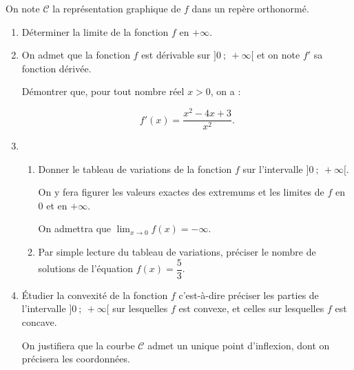\documentclass[10pt,a4paper,french]{article}
\begin{document}
On note $\mathcal{C}$ la représentation graphique de $f$ dans un repère orthonormé.

\medskip

\begin{enumerate}
\item Déterminer la limite de la fonction $f$ en $+\infty$.
\item On admet que la fonction $f$ est dérivable sur $]0~;~ +\infty[$ et on note $f'$ sa fonction dérivée.

Démontrer que, pour tout nombre réel $x > 0$, on a :

\[f'(x) = \dfrac{x^2 - 4x + 3}{x^2}.\]

\item
	\begin{enumerate}
		\item Donner le tableau de variations de la fonction $f$ sur l'intervalle $]0~;~ +\infty[$. 
		
On y fera figurer les valeurs exactes des extremums et les limites de $f$ en $0$ et en $+ \infty$. 
		
On admettra que $\displaystyle\lim_{x \to 0} f(x) = - \infty$.
		\item Par simple lecture du tableau de variations, préciser le nombre de solutions de l'équation $f(x) = \dfrac{5}{3}$.
	\end{enumerate}
\item Étudier la convexité de la fonction $f$ c'est-à-dire préciser les parties de l'intervalle $]0~;~ +\infty[$ sur lesquelles $f$ est convexe, et celles sur lesquelles $f$ est concave. 

On justifiera que la courbe $\mathcal C$ admet un unique point d'inflexion, dont on précisera les coordonnées.
\end{enumerate}
\end{document}
